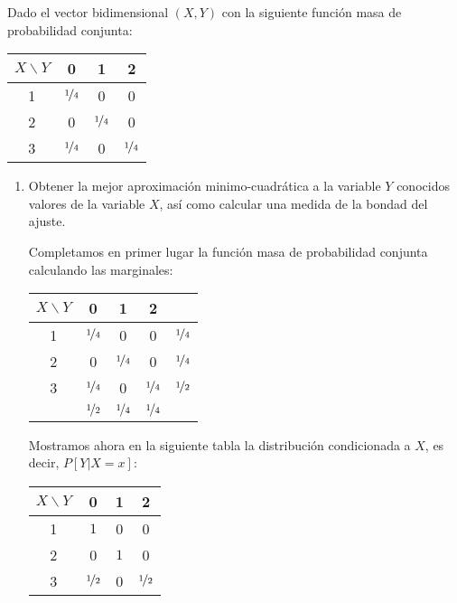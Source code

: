 \documentclass[12pt]{article}
\begin{document}
    \begin{ejercicio}
        Dado el vector bidimensional $(X,Y)$ con la siguiente función masa de probabilidad conjunta:
        \begin{table}[H]
        \centering
        \begin{tabular}{|c|ccc|}
            \hline
            $X\backslash Y$ & 0 & 1 & 2 \\
            \hline
            1 & $\nicefrac{1}{4}$ & 0 & 0 \\
            2 & 0 & $\nicefrac{1}{4}$ & 0 \\
            3 & $\nicefrac{1}{4}$ & 0 & $\nicefrac{1}{4}$ \\
            \hline
        \end{tabular}
        \end{table}
        \begin{enumerate}
            \item Obtener la mejor aproximación minimo-cuadrática a la variable $Y$ conocidos valores de la variable $X$, así como calcular una medida de la bondad del ajuste.
            
            Completamos en primer lugar la función masa de probabilidad conjunta calculando las marginales:
            \begin{table}[H]
                \centering
                \begin{tabular}{c|ccc||c}
                    $X\backslash Y$ & 0 & 1 & 2 \\
                    \hline
                    1 & $\nicefrac{1}{4}$ & 0 & 0 & $\nicefrac{1}{4}$\\
                    2 & 0 & $\nicefrac{1}{4}$ & 0 & $\nicefrac{1}{4}$ \\
                    3 & $\nicefrac{1}{4}$ & 0 & $\nicefrac{1}{4}$ & $\nicefrac{1}{2}$ \\ \hline
                    \hline
                    & $\nicefrac{1}{2}$ & $\nicefrac{1}{4}$ & $\nicefrac{1}{4}$
                \end{tabular}
                \end{table}
            
            Mostramos ahora en la siguiente tabla la distribución condicionada a $X$, es decir, $P[Y|X=x]$:
            \begin{table}[H]
            \centering
            \begin{tabular}{c|ccc}
                $X\backslash Y$ & 0 & 1 & 2 \\
                \hline
                1 & $1$ & 0 & 0 \\
                2 & 0 & $1$ & 0 \\
                3 & $\nicefrac{1}{2}$ & 0 & $\nicefrac{1}{2}$
            \end{tabular}
            \end{table}


\end{enumerate}
\end{ejercicio}
\end{document}
